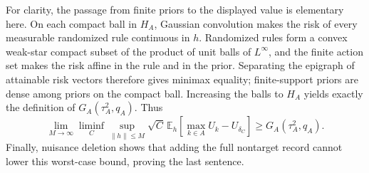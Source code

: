 For clarity, the passage from finite priors to the displayed value is elementary here.  On each compact ball in \(H_A\), Gaussian convolution makes the risk of every measurable randomized rule continuous in \(h\).  Randomized rules form a convex weak-star compact subset of the product of unit balls of \(L^\infty\), and the finite action set makes the risk affine in the rule and in the prior.  Separating the epigraph of attainable risk vectors therefore gives minimax equality; finite-support priors are dense among priors on the compact ball.  Increasing the balls to \(H_A\) yields exactly the definition of \(G_A(\tau_A^2,q_A)\).  Thus
\[
 \lim_{M\to\infty}\liminf_C\sup_{\|h\|\leq M}\sqrt C\,\mathbb E_h[\max_{k\in A}U_k-U_{\delta_C}]
 \geq G_A(\tau_A^2,q_A).
\]
Finally, nuisance deletion shows that adding the full nontarget record cannot lower this worst-case bound, proving the last sentence.